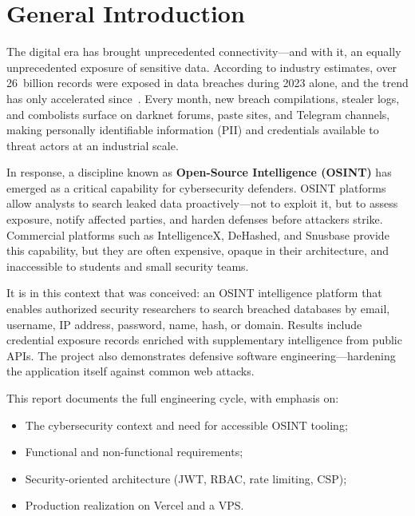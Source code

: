 
\chapter*{General Introduction}

The digital era has brought unprecedented connectivity---and with it, an
equally unprecedented exposure of sensitive data. According to industry
estimates, over 26~billion records were exposed in data breaches during 2023
alone, and the trend has only accelerated since~\cite{ibm-breach-report}. Every
month, new breach compilations, stealer logs, and combolists surface on
darknet forums, paste sites, and Telegram channels, making personally
identifiable information (PII) and credentials available to threat actors at
an industrial scale.

In response, a discipline known as \textbf{Open-Source Intelligence (OSINT)}
has emerged as a critical capability for cybersecurity defenders. OSINT
platforms allow analysts to search leaked data proactively---not to exploit it,
but to assess exposure, notify affected parties, and harden defenses before
attackers strike. Commercial platforms such as IntelligenceX, DeHashed, and
Snusbase provide this capability, but they are often expensive, opaque in
their architecture, and inaccessible to students and small security teams.

It is in this context that \leaklens{} was conceived: an OSINT intelligence
platform that enables authorized security researchers to search breached
databases by email, username, IP address, password, name, hash, or domain.
Results include credential exposure records enriched with supplementary
intelligence from public APIs. The project also demonstrates defensive
software engineering---hardening the application itself against common web
attacks.

This report documents the full engineering cycle, with emphasis on:

\begin{itemize}[nosep]
  \item The cybersecurity context and need for accessible OSINT tooling;
  \item Functional and non-functional requirements;
  \item Security-oriented architecture (JWT, RBAC, rate limiting, CSP);
  \item Production realization on Vercel and a VPS.
\end{itemize}

